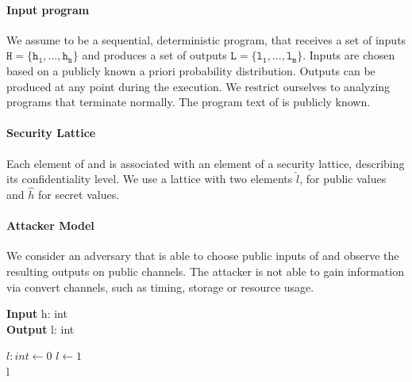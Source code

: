 \paragraph{Input program} We assume \p to be a sequential, deterministic program, that receives a set of inputs $\mathtt{H = \{h_1, ..., h_n\}}$ and produces a set of outputs $\mathtt{L = \{l_1, ..., l_m\}}$. Inputs are chosen based on a publicly known a priori probability distribution. Outputs can be produced at any point during the execution. 
We restrict ourselves to analyzing programs that terminate normally. The program text of \p is publicly known.

\paragraph{Security Lattice} Each element of \In and \Out is associated with an element of a security lattice, describing its confidentiality level. We use a lattice with two elements $\hat{l}$, for public values and $\hat{h}$ for secret values.


\paragraph{Attacker Model} We consider an adversary \A that is able to choose public inputs of \p and observe the resulting outputs on public channels. The attacker is not able to gain information via convert channels, such as timing, storage or resource usage.



\begin{algorithm}
	\caption{} %
    \hspace*{\algorithmicindent} \textbf{Input} h: int \\
    \hspace*{\algorithmicindent} \textbf{Output} l: int
	\begin{algorithmic}[1]
        \State $l: int \leftarrow 0$
        \State $l \leftarrow 1$
        \EndIf\\
        \Return l
	\end{algorithmic} 
\end{algorithm}

